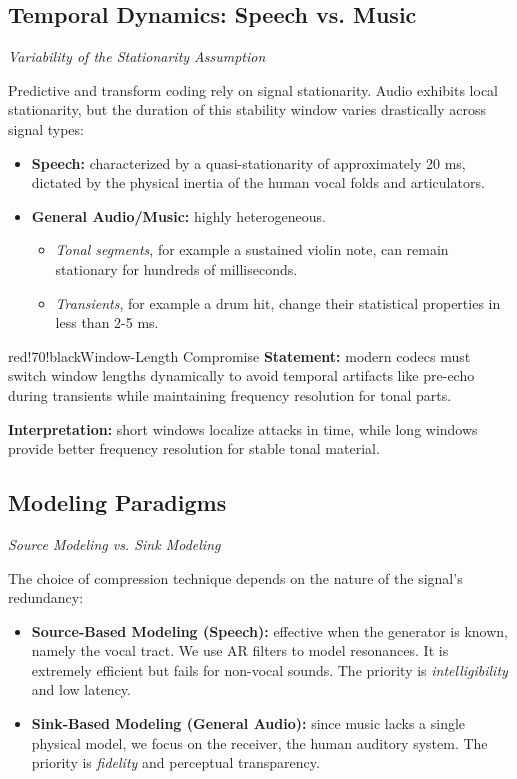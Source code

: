 \subsection{Temporal Dynamics: Speech vs. Music}

\textit{Variability of the Stationarity Assumption}

Predictive and transform coding rely on signal stationarity. Audio exhibits local stationarity, but the duration of this stability window varies drastically across signal types:

\begin{itemize}
\item \textbf{Speech:} characterized by a quasi-stationarity of approximately 20 ms, dictated by the physical inertia of the human vocal folds and articulators.
\item \textbf{General Audio/Music:} highly heterogeneous.
\begin{itemize}
\item \textit{Tonal segments}, for example a sustained violin note, can remain stationary for hundreds of milliseconds.
\item \textit{Transients}, for example a drum hit, change their statistical properties in less than 2-5 ms.
\end{itemize}
\end{itemize}

\begin{calloutbox}{red!70!black}{Window-Length Compromise}
\textbf{Statement:} modern codecs must switch window lengths dynamically to avoid temporal artifacts like pre-echo during transients while maintaining frequency resolution for tonal parts.

\textbf{Interpretation:} short windows localize attacks in time, while long windows provide better frequency resolution for stable tonal material.
\end{calloutbox}

\subsection{Modeling Paradigms}

\textit{Source Modeling vs. Sink Modeling}

The choice of compression technique depends on the nature of the signal's redundancy:

\begin{itemize}
\item \textbf{Source-Based Modeling (Speech):} effective when the generator is known, namely the vocal tract. We use AR filters to model resonances. It is extremely efficient but fails for non-vocal sounds. The priority is \textit{intelligibility} and low latency.
\item \textbf{Sink-Based Modeling (General Audio):} since music lacks a single physical model, we focus on the receiver, the human auditory system. The priority is \textit{fidelity} and perceptual transparency.
\end{itemize}

